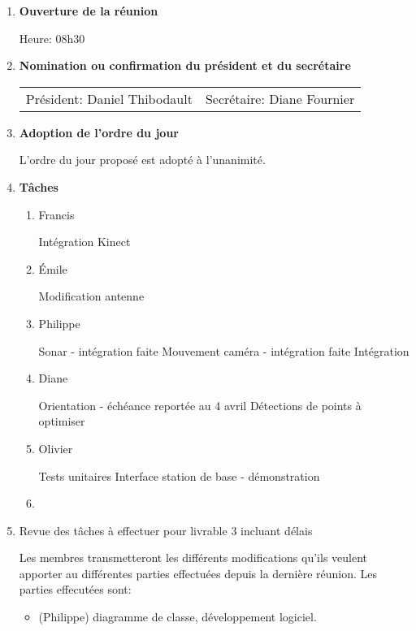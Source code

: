 \documentclass[12pt]{ULojpv}
\begin{document}
\entete
\begin{enumerate}
\item \textbf{Ouverture de la réunion}

Heure: 08h30


\item \textbf{Nomination ou confirmation du président et du secrétaire}

\begin{tabular}{@{}ll}
   Président: Daniel Thibodault
   & Secrétaire: Diane Fournier
\end{tabular}


\item \textbf{Adoption de l'ordre du jour}

L'ordre du jour proposé est adopté à l'unanimité.



\item \textbf{Tâches}

\begin{enumerate}
\item Francis

Intégration Kinect

\item Émile

Modification antenne

\item Philippe

Sonar - intégration faite
Mouvement caméra - intégration faite
Intégration

\item Diane

Orientation - échéance reportée au 4 avril
Détections de points à optimiser

\item Olivier

Tests unitaires
Interface station de base - démonstration

\item

\end{enumerate}

\item {Revue des tâches à effectuer pour livrable 3 incluant délais}

Les membres transmetteront les différents modifications qu'ils veulent apporter au différentes parties effectuées depuis la dernière réunion. Les parties effecutées sont:
\begin{itemize}
\item (Philippe) diagramme de classe, développement logiciel.

\end{itemize}

\end{enumerate}
\end{document}
